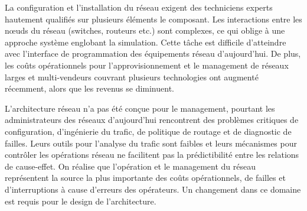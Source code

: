 La configuration et l'installation du réseau exigent des techniciens experts hautement qualifiés sur plusieurs éléments le composant. Les interactions entre les nœuds du réseau (switches, routeurs etc.) sont complexes, ce qui oblige à une approche système englobant la simulation. Cette tâche est difficile d'atteindre avec l'interface de programmation des équipements réseau d'aujourd'hui. De plus, les coûts opérationnels pour l'approvisionnement et le management de réseaux larges et multi-vendeurs  couvrant plusieurs technologies ont augmenté récemment, alors que les revenus se diminuent. \cite{ImplementationChallengesForSDN}







L'architecture réseau n'a pas été conçue pour le management, pourtant les administrateurs des réseaux d'aujourd'hui rencontrent des problèmes critiques de configuration, d'ingénierie du trafic, de politique de routage et de diagnostic de failles. Leurs outils pour l'analyse du trafic sont faibles et leurs mécanismes pour contrôler les opérations réseau ne facilitent pas la prédictibilité entre les relations de cause-effet. On réalise que l'opération et le management du réseau représentent la source la plus importante des coûts opérationnels, de failles et d'interruptions à cause d'erreurs des opérateurs. Un changement dans ce domaine est requis pour le design de l'architecture. \cite{NGSIManagement}


\clearpage




